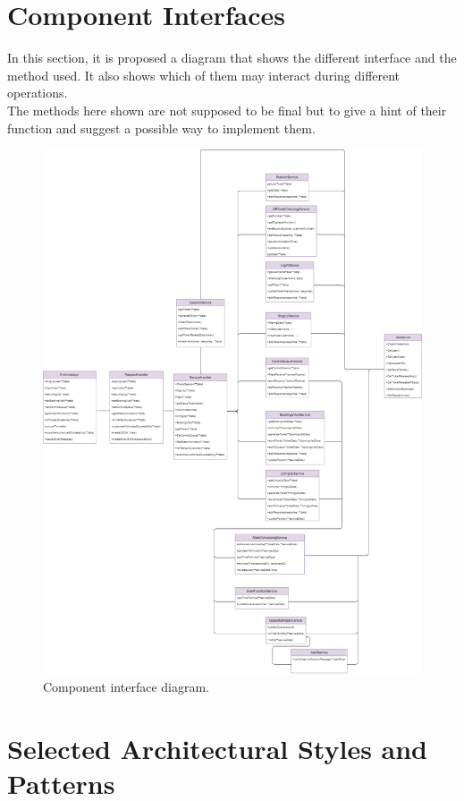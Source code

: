 \section{Component Interfaces}
In this section, it is proposed a diagram that shows the different interface and the method used. It also shows which of them may interact during different operations. \\
The methods here shown are not supposed to be final but to give a hint of their function and suggest a possible way to implement them. 
\begin{figure}[H]
	\centering
	\includegraphics[width=1.0\textwidth]{images/Component_class_diagram.png}
	\caption{Component interface diagram.}\label{fig:Component interface diagram}
\end{figure}

\section{Selected Architectural Styles and Patterns}

